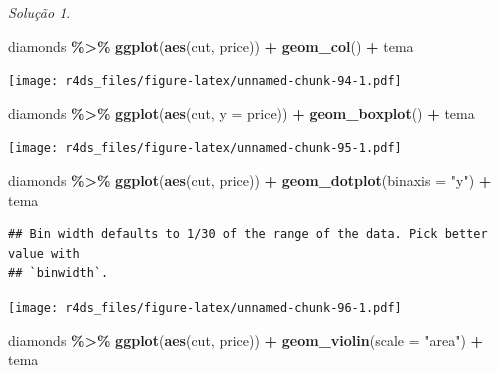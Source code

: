 \documentclass[
]{latex/krantz}
\newenvironment{Shaded}{\begin{snugshade}}{\end{snugshade}}
\newcommand{\AttributeTok}[1]{\textcolor[rgb]{0.13,0.29,0.53}{#1}}
\newcommand{\FunctionTok}[1]{\textcolor[rgb]{0.13,0.29,0.53}{\textbf{#1}}}
\newcommand{\NormalTok}[1]{#1}
\newcommand{\SpecialCharTok}[1]{\textcolor[rgb]{0.81,0.36,0.00}{\textbf{#1}}}
\newcommand{\StringTok}[1]{\textcolor[rgb]{0.31,0.60,0.02}{#1}}
\theoremstyle{definition}
\theoremstyle{definition}
\theoremstyle{definition}
\theoremstyle{definition}
\theoremstyle{remark}
\newtheorem*{solution}{Solução}
\begin{document}
\begin{solution}
\begin{Shaded}
\begin{Highlighting}[]
\NormalTok{diamonds }\SpecialCharTok{\%\textgreater{}\%}
    \FunctionTok{ggplot}\NormalTok{(}\FunctionTok{aes}\NormalTok{(cut, price)) }\SpecialCharTok{+}
        \FunctionTok{geom\_col}\NormalTok{() }\SpecialCharTok{+}
\NormalTok{        tema}
\end{Highlighting}
\end{Shaded}

\texttt{[image: r4ds\_files/figure-latex/unnamed-chunk-94-1.pdf]}

\begin{Shaded}
\begin{Highlighting}[]
\NormalTok{diamonds }\SpecialCharTok{\%\textgreater{}\%}
    \FunctionTok{ggplot}\NormalTok{(}\FunctionTok{aes}\NormalTok{(cut, }\AttributeTok{y =}\NormalTok{ price)) }\SpecialCharTok{+}
        \FunctionTok{geom\_boxplot}\NormalTok{() }\SpecialCharTok{+}
\NormalTok{        tema}
\end{Highlighting}
\end{Shaded}

\texttt{[image: r4ds\_files/figure-latex/unnamed-chunk-95-1.pdf]}

\begin{Shaded}
\begin{Highlighting}[]
\NormalTok{diamonds }\SpecialCharTok{\%\textgreater{}\%}
    \FunctionTok{ggplot}\NormalTok{(}\FunctionTok{aes}\NormalTok{(cut, price)) }\SpecialCharTok{+}
        \FunctionTok{geom\_dotplot}\NormalTok{(}\AttributeTok{binaxis =} \StringTok{"y"}\NormalTok{) }\SpecialCharTok{+}
\NormalTok{        tema}
\end{Highlighting}
\end{Shaded}

\begin{verbatim}
## Bin width defaults to 1/30 of the range of the data. Pick better value with
## `binwidth`.
\end{verbatim}

\texttt{[image: r4ds\_files/figure-latex/unnamed-chunk-96-1.pdf]}

\begin{Shaded}
\begin{Highlighting}[]
\NormalTok{diamonds }\SpecialCharTok{\%\textgreater{}\%}
    \FunctionTok{ggplot}\NormalTok{(}\FunctionTok{aes}\NormalTok{(cut, price)) }\SpecialCharTok{+}
        \FunctionTok{geom\_violin}\NormalTok{(}\AttributeTok{scale =} \StringTok{"area"}\NormalTok{) }\SpecialCharTok{+}
\NormalTok{        tema}
\end{Highlighting}
\end{Shaded}


\end{solution}
\end{document}
